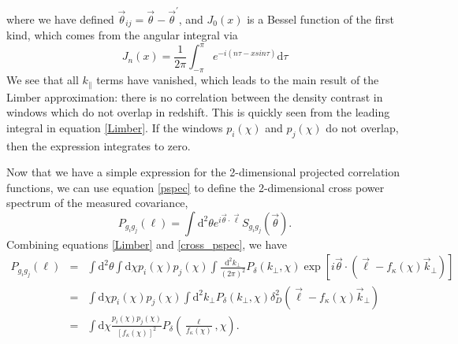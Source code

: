 \documentclass[12pt,preprint]{aastex}			%
\newcommand{\rcom}{\chi}
\newcommand{\dd}{\mathrm{d}}
\begin{document}
where we have defined $\vec \theta_{ij} = \vec{\theta} -\vec{\theta}^\prime$, 
and $J_0(x)$ is a Bessel function of the first kind, which comes from 
the angular integral via
\begin{equation}
  \label{bessel_j}
  J_n(x) = \frac{1}{2\pi}\int_{-\pi}^{\pi} e^{-i(n\tau-x sin\tau)}\dd\tau
\end{equation}
We see that all $k_\parallel$ terms have vanished, which leads to the main
result of the Limber approximation: there is no correlation between the 
density contrast in windows which do not overlap 
in redshift. This is quickly seen from the leading integral in equation 
\ref{Limber}.  If the windows $p_i(\rcom)$ and $p_j(\rcom)$ do 
not overlap, then the expression integrates to zero.  

Now that we have a simple expression for the 2-dimensional projected 
correlation functions, we can use equation \ref{pspec} to define the 
2-dimensional cross power spectrum of the measured covariance,
\begin{equation} 
  \label{cross_pspec}
  P_{g_ig_j}(\ell) = \int \dd^2\theta e^{i\vec\theta\cdot\vec\ell}S_{g_ig_j}(\vec\theta).
\end{equation}
Combining equations \ref{Limber} and \ref{cross_pspec}, we have
\begin{eqnarray}
  \label{cross_pspec2}
  P_{g_ig_j}(\ell) 
  &=& \int \dd^2\theta
  \int \dd\rcom p_i(\rcom)p_j(\rcom)
  \int \frac{\dd^2k_\perp}{(2\pi)^2}
  P_\delta(k_\perp,\rcom)
  \exp\left[i\vec\theta\cdot(\vec\ell- f_\kappa(\rcom) 
    \vec k_\perp)\right]\nonumber\\
  &=&\int \dd\rcom p_i(\rcom)p_j(\rcom)\int \dd^2k_\perp
  P_\delta(k_\perp,\rcom)\delta_D^2(\vec\ell- f_\kappa(\rcom)\vec k_\perp)
  \nonumber\\
  &=& \int \dd\rcom\frac{p_i(\rcom)p_j(\rcom)}{[f_\kappa(\rcom)]^2}P_\delta\left(\frac{\ell}{f_\kappa(\rcom)},\rcom\right).
\end{eqnarray}
\end{document}
